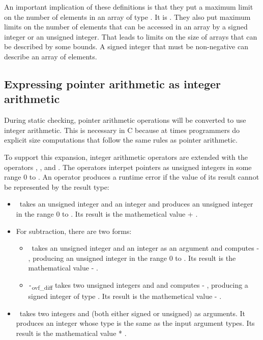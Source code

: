 An important implication of these definitions is that they put a maximum
limit on the number of elements in an array of type . It is
. They also put
maximum limits on the number of elements that can be accessed in an
array by a signed integer or an unsigned integer. That leads to limits
on the size of arrays that can be described by some bounds. A signed
integer that must be non-negative can describe an array of
 elements.

\subsection{Expressing pointer arithmetic as integer arithmetic}
\label{section:pointers-as-integers}

During static checking, pointer arithmetic operations will be converted
to use integer arithmetic. This is necessary in C because at times
programmers do explicit size computations that follow the same rules as
pointer arithmetic.

To support this expansion, integer arithmetic operators are extended
with the operators \plusovf, \minusovf, and \mulovf. The
operators interpet pointers as unsigned integers in some range 0 to
. An operator produces a runtime error if the value
of its result cannot be represented by the result type:

\begin{itemize}
\item
  \plusovf\ takes an unsigned integer  and an
  integer  and produces an unsigned integer in the range 0 to
  . Its result is the mathemetical value  + .
\item
  For subtraction, there are two forms:

  \begin{itemize}
  \item
    \minusovf\ takes an unsigned integer  and an
    integer  as an argument and computes  - , producing an unsigned
    integer in the range 0 to . Its result is the
    mathematical value  - .
  \item
    \lstinline|-|\textsubscript{ovf\_diff } takes two unsigned integers 
    and  and computes  - , producing a signed integer of type
    . Its result is the mathemetical value  - .
  \end{itemize}
\item
  \mulovf\ takes two integers  and  (both either
  signed or unsigned) as arguments. It produces an integer whose type is
  the same as the input argument types. Its result is the mathematical
  value  * .
\end{itemize}

